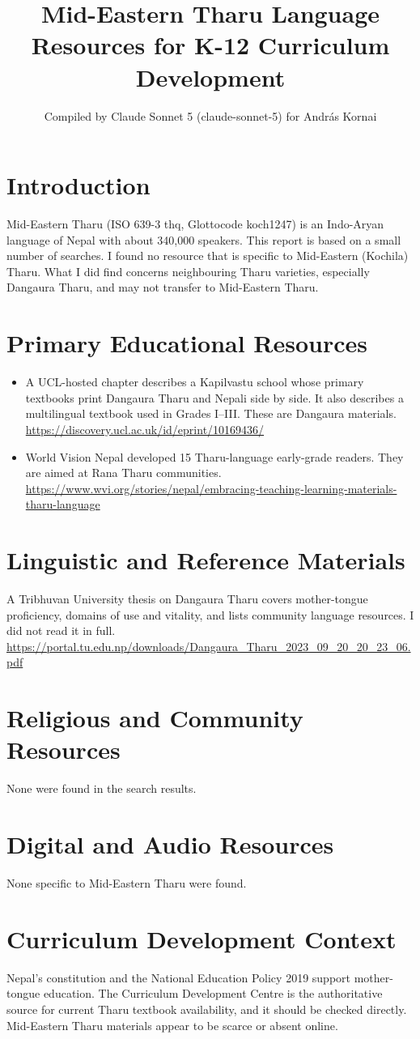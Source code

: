 \documentclass[12pt]{article}
\title{Mid-Eastern Tharu Language Resources for K-12 Curriculum Development}
\author{Compiled by Claude Sonnet 5 (claude-sonnet-5) for Andr\'as Kornai}
\date{}
\begin{document}
\maketitle

\section{Introduction}
Mid-Eastern Tharu (ISO 639-3 thq, Glottocode koch1247) is an Indo-Aryan language of Nepal with about 340,000 speakers. This report is based on a small number of searches. I found no resource that is specific to Mid-Eastern (Kochila) Tharu. What I did find concerns neighbouring Tharu varieties, especially Dangaura Tharu, and may not transfer to Mid-Eastern Tharu.

\section{Primary Educational Resources}
\begin{itemize}
\item A UCL-hosted chapter describes a Kapilvastu school whose primary textbooks print Dangaura Tharu and Nepali side by side. It also describes a multilingual textbook used in Grades I--III. These are Dangaura materials. \url{https://discovery.ucl.ac.uk/id/eprint/10169436/}
\item World Vision Nepal developed 15 Tharu-language early-grade readers. They are aimed at Rana Tharu communities. \url{https://www.wvi.org/stories/nepal/embracing-teaching-learning-materials-tharu-language}
\end{itemize}

\section{Linguistic and Reference Materials}
A Tribhuvan University thesis on Dangaura Tharu covers mother-tongue proficiency, domains of use and vitality, and lists community language resources. I did not read it in full. \url{https://portal.tu.edu.np/downloads/Dangaura_Tharu_2023_09_20_20_23_06.pdf}

\section{Religious and Community Resources}
None were found in the search results.

\section{Digital and Audio Resources}
None specific to Mid-Eastern Tharu were found.

\section{Curriculum Development Context}
Nepal's constitution and the National Education Policy 2019 support mother-tongue education. The Curriculum Development Centre is the authoritative source for current Tharu textbook availability, and it should be checked directly. Mid-Eastern Tharu materials appear to be scarce or absent online.
\end{document}
